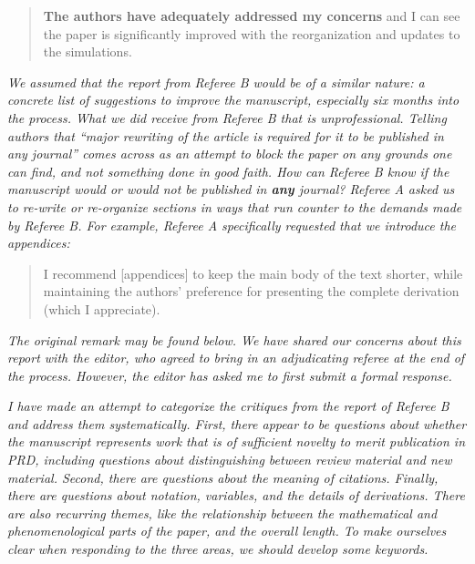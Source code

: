 \documentclass[12pt]{article}
\begin{document}
\begin{quote}
\textbf{The authors have adequately addressed my concerns} and I can see the paper is significantly improved with the reorganization and updates to the simulations.
\end{quote}

\textit{We assumed that the report from Referee B would be of a similar nature: a concrete list of suggestions to improve the manuscript, especially six months into the process.  What we did receive from Referee B that is unprofessional.  Telling authors that ``major rewriting of the article is required for it to be published in any journal'' comes across as an attempt to block the paper on any grounds one can find, and not something done in good faith.  How can Referee B know if the manuscript would or would not be published in \textbf{any} journal?  Referee A asked us to re-write or re-organize sections in ways that run counter to the demands made by Referee B.  For example, Referee A specifically requested that we introduce the appendices:}

\begin{quote}
I recommend [appendices] to keep the main body of the text shorter, while maintaining the authors’ preference for presenting the complete derivation (which I appreciate).
\end{quote}

\textit{The original remark may be found below.  We have shared our concerns about this report with the editor, who agreed to bring in an adjudicating referee at the end of the process.  However, the editor has asked me to first submit a formal response.}

\textit{I have made an attempt to categorize the critiques from the report of Referee B and address them systematically.  First, there appear to be questions about whether the manuscript represents work that is of sufficient novelty to merit publication in PRD, including questions about distinguishing between review material and new material.  Second, there are questions about the meaning of citations.  Finally, there are questions about notation, variables, and the details of derivations.  There are also recurring themes, like the relationship between the mathematical and phenomenological parts of the paper, and the overall length.  To make ourselves clear when responding to the three areas, we should develop some keywords.}
\end{document}
